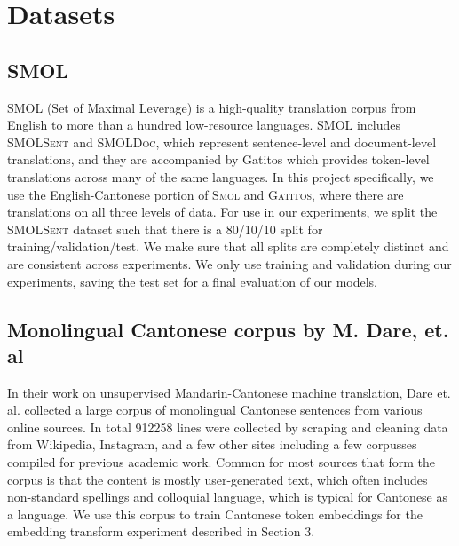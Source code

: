 \section{Datasets}
\subsection{\textsc{SMOL}}
\textsc{SMOL}\cite{caswell2025smolprofessionallytranslatedparallel} (Set of Maximal Leverage) is a high-quality translation corpus from English to more than a hundred low-resource languages. \textsc{SMOL} includes \textsc{SMOLSent} and \textsc{SMOLDoc}, which represent sentence-level and document-level translations, and they are accompanied by Gatitos\cite{jones-etal-2023-gatitos} which provides token-level translations across many of the same languages.
In this project specifically, we use the English-Cantonese portion of \textsc{Smol} and \textsc{Gatitos}, where there are translations on all three levels of data. For use in our experiments, we split the \textsc{SMOLSent} dataset such that there is a 80/10/10 split for training/validation/test. We make sure that all splits are completely distinct and are consistent across experiments. We only use training and validation during our experiments, saving the test set for a final evaluation of our models.

\subsection{Monolingual Cantonese corpus by M. Dare, et. al}
In their work on unsupervised Mandarin-Cantonese machine translation, Dare et. al.\cite{dare2023unsupervisedmandarincantonesemachinetranslation} collected a large corpus of monolingual Cantonese sentences from various online sources. In total 912258 lines were collected by scraping and cleaning data from Wikipedia, Instagram, and a few other sites including a few corpusses compiled for previous academic work. Common for most sources that form the corpus is that the content is mostly user-generated text, which often includes non-standard spellings and colloquial language, which is typical for Cantonese as a language.
We use this corpus to train Cantonese token embeddings for the embedding transform experiment described in Section 3.